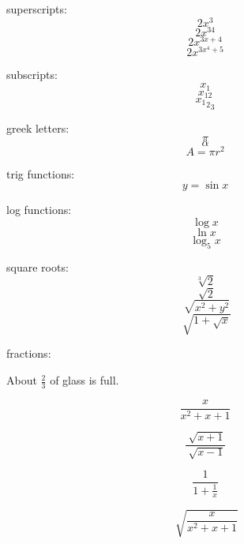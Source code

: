\documentclass[11pt]{article}
\begin{document}
superscripts: $$2x^3$$
$$2x^{34}$$ %
$$2x^{3x+4}$$
$$2x^{3x^4+5}$$

subscripts:
$$x_1$$
$$x_{12}$$
$${{x_1}_2}_3$$

greek letters:
$$\pi$$
$$\alpha$$
$$A=\pi r^2$$

trig functions:
$$y=\sin{x}$$

log functions:
$$\log{x}$$
$$\ln{x}$$
$$\log_5{x}$$

square roots:
$$\sqrt[3]{2}$$
$$\sqrt[]{2}$$
$$\sqrt[]{x^2+y^2}$$
$$\sqrt[]{1+\sqrt{x}}$$

fractions:

About $\displaystyle{\frac{2}{3}}$ of glass is full.

$$\frac{x}{x^2+x+1}$$

$$\frac{\sqrt[]{x+1}}{\sqrt[]{x-1}}$$

$$\frac{1}{1+\frac{1}{x}}$$

$$\sqrt[]{\frac{x}{x^2+x+1}}$$
\end{document}
